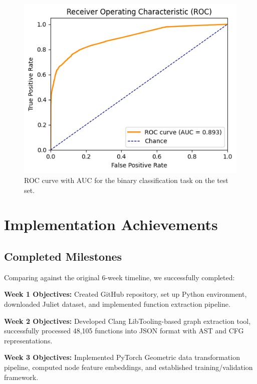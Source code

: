 \begin{figure}[t]
	\centering
	\includegraphics[width=\linewidth]{../model/logs/roc_curve.png}
	\caption{ROC curve with AUC for the binary classification task on the test set.}
	\label{fig:roc-curve}
\end{figure}

\section{Implementation Achievements}

\subsection{Completed Milestones}

Comparing against the original 6-week timeline, we successfully completed:

\textbf{Week 1 Objectives:}  Created GitHub repository, set up Python environment, downloaded Juliet dataset, and implemented function extraction pipeline.

\textbf{Week 2 Objectives:}  Developed Clang LibTooling-based graph extraction tool, successfully processed 48,105 functions into JSON format with AST and CFG representations.

\textbf{Week 3 Objectives:}  Implemented PyTorch Geometric data transformation pipeline, computed node feature embeddings, and established training/validation framework.

